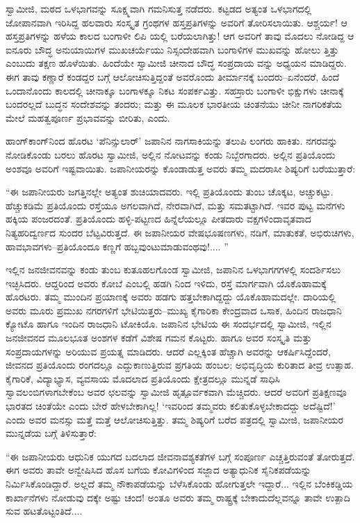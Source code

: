 ಸ್ವಾಮೀಜಿ, ಮಠದ ಒಳಭಾಗವನ್ನು ಸೂಕ್ಷ್ಮವಾಗಿ ಗಮನಿಸುತ್ತ ನಡೆದರು. ಕಟ್ಟಡದ ಅತ್ಯಂತ ಒಳಭಾಗದಲ್ಲಿ ಜೋಪಾನವಾಗಿ ಇರಿಸಿದ್ದ ಹಲವಾರು ಸಂಸ್ಕೃತ ಗ್ರಂಥಗಳ ಹಸ್ತಪ್ರತಿಗಳನ್ನು ಅವರಿಗೆ ತೋರಿಸಲಾಯಿತು. ಆಶ್ಚರ್ಯ! ಆ ಹಸ್ತಪ್ರತಿಗಳನ್ನು ಹಳೆಯ ಕಾಲದ ಬಂಗಾಳೀ ಲಿಪಿ ಯಲ್ಲಿ ಬರೆಯಲಾಗಿತ್ತು! ಆಗ ಅವರಿಗೆ ತಾವು ಮೊದಲು ನೋಡಿದ್ದ ಆ ಐನೂರು ಬೌದ್ಧ ಅನುಯಾಯಿಗಳ ಮುಖಚರ್ಯೆಯು ನಿಸ್ಸಂದೇಹವಾಗಿ ಬಂಗಾಳಿಗಳ ಮುಖವನ್ನು ಹೋಲು ತ್ತಿತ್ತು ಎಂಬುದು ತಕ್ಷಣ ಹೊಳೆಯಿತು. ಹಿಂದೆಯೇ ಸ್ವಾಮೀಜಿ ಚೀನಾದ ಬೌದ್ಧ ಸಂಪ್ರದಾಯ ವನ್ನು ಅಧ್ಯಯನ ಮಾಡಿದ್ದರು. ಈಗ ತಾವು ಕಣ್ಣಾರೆ ಕಂಡದ್ದರ ಬಗ್ಗೆ ಆಲೋಚಿಸುತ್ತಿದ್ದಂತೆ ಅವರೊಂದು ತೀರ್ಮಾನಕ್ಕೆ ಬಂದರು–ಏನೆಂದರೆ, ಹಿಂದೆ ಒಂದಾನೊಂದು ಕಾಲದಲ್ಲಿ ಚೀನಾಕ್ಕೂ ಬಂಗಾಳಕ್ಕೂ ನಿಕಟ ಸಂಪರ್ಕವಿತ್ತು. ಸಹಸ್ರಾರು ಬಂಗಾಳೀ ಭಿಕ್ಷುಗಳು ಚೀನಾಕ್ಕೆ ಬಂದರಲ್ಲದೆ ಬುದ್ಧನ ಸಂದೇಶವನ್ನು ತಂದರು; ಮತ್ತು ಈ ಮೂಲಕ ಭಾರತೀಯ ಚಿಂತನೆಯು ಚೀನೀ ನಾಗರಿಕತೆಯ ಮೇಲೆ ಮಹತ್ವಪೂರ್ಣ ಪ್ರಭಾವವನ್ನು ಬೀರಿತು, ಎಂದು.

ಹಾಂಗ್​ಕಾಂಗ್​ನಿಂದ ಹೊರಟ ‘ಪೆನಿನ್ಸುಲಾರ್​’ ಜಪಾನಿನ ನಾಗಸಾಕಿಯನ್ನು ತಲುಪಿ ಲಂಗರು ಹಾಕಿತು. ನಗರವನ್ನು ನೋಡಿಕೊಂಡು ಬರಲು ಹೊರಟ ಸ್ವಾಮೀಜಿ, ಅಲ್ಲಿನ ನೋಟವನ್ನು ಕಂಡು ನಿಬ್ಬೆರಗಾದರು. ಅಲ್ಲಿನ ಪ್ರತಿಯೊಂದು ಅಂಶವೂ ಅವರಿಗೆ ಇಷ್ಟವಾಯಿತು. ಜಪಾನೀಯರನ್ನು ಕೊಂಡಾಡುತ್ತ ಅವರು ತಮ್ಮ ಮದರಾಸೀ ಶಿಷ್ಯರಿಗೆ ಬರೆಯುತ್ತಾರೆ:

“ಈ ಜಪಾನೀಯರು ಜಗತ್ತಿನಲ್ಲೇ ಅತ್ಯಂತ ಶುಚಿಯಾದವರು. ಇಲ್ಲಿ ಪ್ರತಿಯೊಂದು ತುಂಬ ಚೊಕ್ಕಟ, ಅಚ್ಚುಕಟ್ಟು. ಹೆಚ್ಚುಕಡಿಮೆ ಪ್ರತಿಯೊಂದು ರಸ್ತೆಯೂ ಅಗಲವಾಗಿದೆ, ನೇರವಾಗಿದೆ, ಮತ್ತು ಸಮತಟ್ಟಾಗಿದೆ. ಇವರ ಪುಟ್ಟ ಮನೆಗಳು ಹಕ್ಕಿಯ ಪಂಜರದಂತೆ. ಪ್ರತಿಯೊಂದು ಹಳ್ಳಿ-ಪಟ್ಟಣದ ಹಿನ್ನೆಲೆಯಲ್ಲೂ ಪೀತದಾರು ವಕ್ಷಗಳಿಂದಾವೃತವಾದ ನಿತ್ಯಹರಿದ್ವರ್ಣದ ಸುಂದರ ಬೆಟ್ಟವಿರುತ್ತದೆ. ಈ ಜಪಾನೀಯರ ವೇಷಭೂಷಣಗಳು, ನಡಿಗೆ, ಮಾತುಕತೆ, ಅಭಿರುಚಿಗಳು, ಹಾವಭಾವಗಳು–ಪ್ರತಿಯೊಂದೂ ಕಣ್ಣಗೆ ಹಬ್ಬವುಂಟುಮಾಡುವಂಥವು!.... ”

ಇಲ್ಲಿನ ಜನಜೀವನವನ್ನು ಕಂಡು ತುಂಬ ಕುತೂಹಲಗೊಂಡ ಸ್ವಾಮೀಜಿ, ಜಪಾನಿನ ಒಳಭಾಗಗಗಳಲ್ಲಿ ಸಂದರ್ಶಿಸಲು ಇಚ್ಛಿಸಿದರು. ಆದ್ದರಿಂದ ಅವರು ಕೋಬೆ ಎಂಬಲ್ಲಿ ಹಡಗಿ ನಿಂದ ಇಳಿದು, ರಸ್ತೆ ಮಾರ್ಗವಾಗಿ ಯೊಕೊಹಾಮಕ್ಕೆ ಹೊರಟರು. ತಮ್ಮ ಮುಂದಿನ ಪ್ರಯಾಣಕ್ಕೆ ಅವರು ಹಡಗು ಹತ್ತಬೇಕಾಗಿದ್ದದ್ದು ಯೊಕೊಹಾಮದಲ್ಲೇ. ದಾರಿಯಲ್ಲಿ ಅವರು ಮೂರು ಪ್ರಮುಖ ನಗರಗಳಿಗೆ ಭೇಟಿಯಿತ್ತರು–ಮುಖ್ಯ ಕೈಗಾರಿಕಾ ಕೇಂದ್ರವಾದ ಒಸಾಕ, ಹಿಂದಿನ ರಾಜಧಾನಿ ಕ್ಯೋಟೊ ಹಾಗೂ ಇಂದಿನ ರಾಜಧಾನಿ ಟೋಕಿಯೊ. ಜಪಾನಿನ ಭೇಟಿಯ ಈ ಸಂದರ್ಭದಲ್ಲಿ ಸ್ವಾಮೀಜಿ, ಇಲ್ಲಿನ ಜನಜೀವನದ ಮೂಲಭೂತ ಅಂಶಗಳ ಕಡೆಗೆ ವಿಶೇಷ ಗಮನ ಕೊಟ್ಟರು. ಹಾಗೂ ಅವರ ಸಂಸ್ಕೃತಿ ಮತ್ತು ಸಂಪ್ರದಾಯಗಳನ್ನು ಅರಿಯುವ ಪ್ರಯತ್ನ ಮಾಡಿದರು. ಆದರೆ ಎಲ್ಲಕ್ಕಿಂತ ಹೆಚ್ಚಾಗಿ ಅವರನ್ನು ಆಕರ್ಷಿಸಿದ್ದೆಂದರೆ, ಜೀವನದ ಪ್ರತಿಯೊಂದು ರಂಗದಲ್ಲೂ ಎದ್ದುಕಾಣುತ್ತಿರುವ ಪ್ರಗತಿಯ ಹಂಬಲ; ಅಭಿವೃದ್ಧಿಯ ಕುರಿತಾದ ತೀವ್ರ ಉತ್ಸಾಹ. ಕೈಗಾರಿಕೆ, ವಿದ್ಯಾಭ್ಯಾಸ, ವ್ಯವಸಾಯ ಮೊದಲಾದ ಪ್ರತಿಯೊಂದು ಕ್ಷೇತ್ರದಲ್ಲೂ ಮುನ್ನಡೆ ಸಾಧಿಸಿ ಸ್ವಾವಲಂಬಿಗಳಾಗಬೇಕೆಂಬ ಅವರ ಛಲವನ್ನು ಸ್ವಾಮೀಜಿ ಹೃತ್ಪೂರ್ವಕವಾಗಿ ಮೆಚ್ಚಿದರು. ಆದರೆ ಅವರಿಗೆ ಪ್ರತಿಕ್ಷಣವೂ ಭಾರತದ ಚಿಂತೆಯೇ ಎಂದು ಬೇರೆ ಹೇಳಬೇಕಾಗಿಲ್ಲ! ‘ಇವರಿಂದ ತಮ್ಮವರು ಕಲಿತುಕೊಳ್ಳಬೇಕಾದದ್ದು ಅದೆಷ್ಟಿದೆ!’ ಎಂದು ಅವರ ಮನಸ್ಸು ಮತ್ತೆ ಮತ್ತೆ ಆಲೋಚಿಸುತ್ತಿತ್ತು. ತಮ್ಮ ಶಿಷ್ಯರಿಗೆ ಬರೆದ ಪತ್ರದಲ್ಲಿ ಸ್ವಾಮೀಜಿ, ಜಪಾನೀಯರ ಮುನ್ನಡೆಯ ಬಗ್ಗೆ ತಿಳಿಸುತ್ತಾರೆ:

“ಈ ಜಪಾನೀಯರು ಆಧುನಿಕ ಯುಗದ ಬದಲಾದ ಜೀವನಾವಶ್ಯಕತೆಗಳ ಬಗ್ಗೆ ಸಂಪೂರ್ಣ ಎಚ್ಚತ್ತಿರುವಂತೆ ತೋರುತ್ತದೆ. ಈಗ ಅವರು ತಾವೇ ಅನ್ವೇಷಿಸಿದ ಹೊಸ ಬಗೆಯ ಕೋವಿಗಳಿಂದ ಸಜ್ಜಾದ ಅತ್ಯಾಧುನಿಕ ಸೈನಿಕಪಡೆಯನ್ನು ನಿರ್ಮಿಸಿಕೊಂಡಿದ್ದಾರೆ. ಅಲ್ಲದೆ ತಮ್ಮ ನೌಕಾಪಡೆಯನ್ನು ಬೆಳೆಸಿಕೊಂಡು ಹೋಗುತ್ತಲೇ ಇದ್ದಾರೆ... ಇಲ್ಲಿನ ಬೆಂಕಿಕಡ್ಡಿಯ ಕಾರ್ಖಾನೆಗಳು ನೋಡುವು ದಕ್ಕೇ ಅಷ್ಟು ಚಂದ! ಅಂತೂ ಅವರು ತಮ್ಮ ರಾಷ್ಟ್ರಕ್ಕೆ ಬೇಕಾದುದೆಲ್ಲವನ್ನೂ ತಾವೇ ಉತ್ಪಾದಿ ಸುವ ಹಟತೊಟ್ಟಂತಿದೆ....

